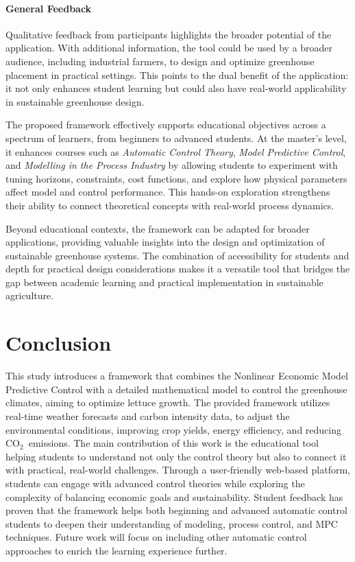 \documentclass[conference]{IEEEtran}
\newcommand{\coo}{\ensuremath{\mathrm{CO_2}}}
\begin{document}
\paragraph{General Feedback}
Qualitative feedback from participants highlights the broader potential of the application. With additional information, the tool could be used by a broader audience, including industrial farmers, to design and optimize greenhouse placement in practical settings. This points to the dual benefit of the application: it not only enhances student learning but could also have real-world applicability in sustainable greenhouse design.

The proposed framework effectively supports educational objectives across a spectrum of learners, from beginners to advanced students. At the master's level, it enhances courses such as \textit{Automatic Control Theory}, \textit{Model Predictive Control}, and \textit{Modelling in the Process Industry} by allowing students to experiment with tuning horizons, constraints, cost functions, and explore how physical parameters affect model and control performance. This hands-on exploration strengthens their ability to connect theoretical concepts with real-world process dynamics.

Beyond educational contexts, the framework can be adapted for broader applications, providing valuable insights into the design and optimization of sustainable greenhouse systems. The combination of accessibility for students and depth for practical design considerations makes it a versatile tool that bridges the gap between academic learning and practical implementation in sustainable agriculture.

\section{Conclusion}
This study introduces a framework that combines the Nonlinear Economic Model Predictive Control with a detailed mathematical model to control the greenhouse climates, aiming to optimize lettuce growth. The provided framework utilizes real-time weather forecasts and carbon intensity data, to adjust the environmental conditions, improving crop yields, energy efficiency, and reducing \coo\ emissions.
%
The main contribution of this work is the educational tool helping students to understand not only the control theory but also to connect it with practical, real-world challenges. Through a user-friendly web-based platform, students can engage with advanced control theories while exploring the complexity of balancing economic goals and sustainability.
%
Student feedback has proven that the framework helps both beginning and advanced automatic control students to deepen their understanding of modeling, process control, and MPC techniques. Future work will focus on including other automatic control approaches to enrich the learning experience further.



\end{document}
